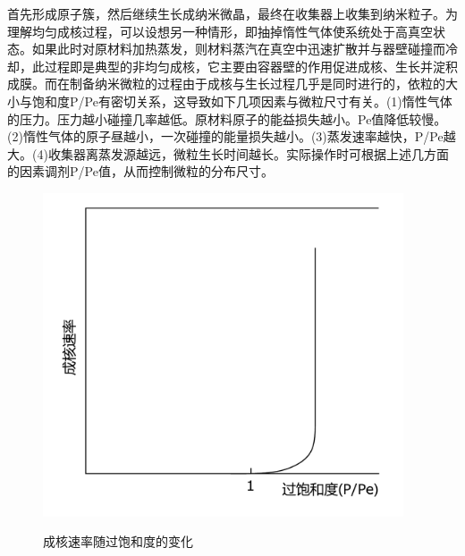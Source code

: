 \documentclass[a4paper]{article}
\begin{document}
首先形成原子簇，然后继续生长成纳米微晶，最终在收集器上收集到纳米粒子。为理解均匀成核过程，可以设想另一种情形，即抽掉惰性气体使系统处于高真空状态。如果此时对原材料加热蒸发，则材料蒸汽在真空中迅速扩散并与器壁碰撞而冷却，此过程即是典型的非均匀成核，它主要由容器壁的作用促进成核、生长并淀积成膜。而在制备纳米微粒的过程由于成核与生长过程几乎是同时进行的，依粒的大小与饱和度P/Pe有密切关系，这导致如下几项因素与微粒尺寸有关。(1)惰性气体的压力。压力越小碰撞几率越低。原材料原子的能益损失越小。Pe值降低较慢。(2)惰性气体的原子昼越小，一次碰撞的能量损失越小。(3)蒸发速率越快，P/Pe越大。(4)收集器离蒸发源越远，微粒生长时间越长。实际操作时可根据上述几方面的因素调剂P/Pe值，从而控制微粒的分布尺寸。
\begin{figure}[!ht]
\begin{minipage}{0.48\textwidth}
\begin{center}
\includegraphics[width=0.95\textwidth]{fig/fig5.pdf}\\
\caption{成核速率随过饱和度的变化}\label{fig5}
\end{center}
\end{minipage}
\begin{minipage}{0.48\textwidth}
\begin{center}

\end{center}
\end{minipage}
\end{figure}
\end{document}
